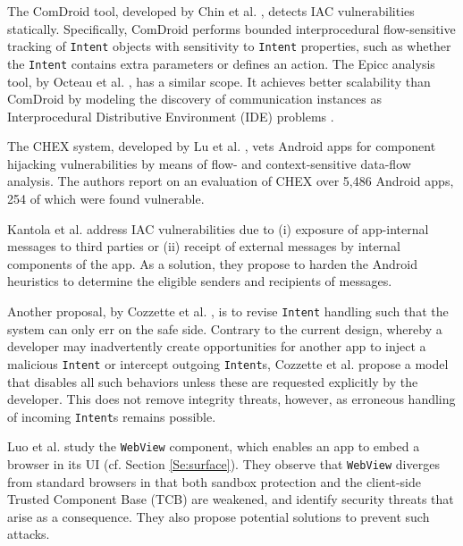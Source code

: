  The ComDroid tool, developed by Chin et al. \cite{CFGW:MOBISYS11}, detects IAC vulnerabilities statically. Specifically, ComDroid performs bounded interprocedural flow-sensitive tracking of {\tt Intent} objects with sensitivity to {\tt Intent} properties, such as whether the {\tt Intent} contains extra parameters or defines an action. The Epicc analysis tool, by Octeau et al. \cite{Epicc}, has a similar scope. It achieves better scalability than ComDroid by modeling the discovery of communication instances as Interprocedural Distributive Environment (IDE) problems \cite{IDE}.

The CHEX system, developed by Lu et al. \cite{LLWLJ:CCS12}, vets Android apps for component hijacking vulnerabilities by means of flow- and context-sensitive data-flow analysis. The authors report on an evaluation of CHEX over 5,486 Android apps, 254 of which were found vulnerable.  

Kantola et al. \cite{KCHW:SPSM12} address IAC vulnerabilities due to (i) exposure of app-internal messages to third parties or (ii) receipt of external messages by internal components of the app. As a solution, they propose to harden the Android heuristics to determine the eligible senders and recipients of messages.

Another proposal, by Cozzette et al. \cite{CLMOABFKNR:IM13}, is to revise {\tt Intent} handling such that the system can only err on the safe side. Contrary to the current design, whereby a developer may inadvertently create opportunities for another app to inject a malicious {\tt Intent} or intercept outgoing {\tt Intent}s, Cozzette et al. propose a model that disables all such behaviors unless these are requested explicitly by the developer. This does not remove integrity threats, however, as erroneous handling of incoming {\tt Intent}s remains possible.

Luo et al. study the {\tt WebView} component, which enables an app to embed a browser in its UI (cf. Section \ref{Se:surface}). They observe that {\tt WebView} diverges from standard browsers in that both sandbox protection and the client-side Trusted Component Base (TCB) are weakened, and identify security threats that arise as a consequence. They also propose potential solutions to prevent such attacks.